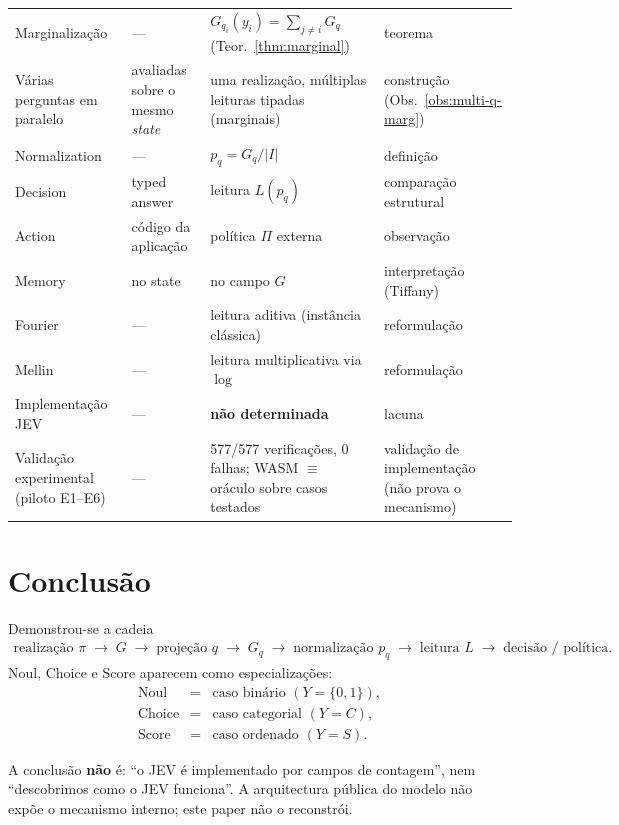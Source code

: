 \documentclass[11pt,a4paper]{article}
\begin{document}
\begin{center}
\begin{tabular}{@{}p{}p{}p{}p{}@{}}
Marginalização & --- & \(G_{q_i}(y_i)=\sum_{j\neq i}G_q\) (Teor.~\ref{thm:marginal}) & teorema \\
Várias perguntas em paralelo & avaliadas sobre o mesmo \textit{state} & uma realização, múltiplas leituras tipadas (marginais) & construção (Obs.~\ref{obs:multi-q-marg}) \\
Normalization & --- & \(p_q=G_q/\lvert I\rvert\) & definição \\
Decision & typed answer & leitura \(L(p_q)\) & comparação estrutural \\
Action & código da aplicação & política \(\Pi\) externa & observação \\
Memory & no state & no campo \(G\) & interpretação (Tiffany) \\
Fourier & --- & leitura aditiva (instância clássica) & reformulação \\
Mellin & --- & leitura multiplicativa via \(\log\) & reformulação \\
Implementação JEV & --- & \textbf{não determinada} & lacuna \\
Validação experimental (piloto E1--E6) & --- & 577/577 verificações, 0 falhas; WASM $\equiv$ oráculo sobre casos testados & validação de implementação (não prova o mecanismo) \\
\bottomrule
\end{tabular}
\end{center}

\section{Conclusão}

Demonstrou-se a cadeia
\[
\boxed{
\begin{array}{c}
\text{realização }\pi
\;\to\;
G
\;\to\;
\text{projeção }q
\;\to\;
G_q
\;\to\;
\text{normalização }p_q
\;\to\;
\text{leitura }L
\;\to\;
\text{decisão / política.}
\end{array}
}
\]
Noul, Choice e Score aparecem como especializações:
\[
\begin{array}{rcl}
\text{Noul} &=& \text{caso binário }(Y=\{0,1\}),\\
\text{Choice} &=& \text{caso categorial }(Y=C),\\
\text{Score} &=& \text{caso ordenado }(Y=S).
\end{array}
\]

A conclusão \textbf{não} é: ``o JEV é implementado por campos de contagem'',
nem ``descobrimos como o JEV funciona''. A arquitectura pública do modelo não
expõe o mecanismo interno; este paper não o reconstrói.
\end{document}

